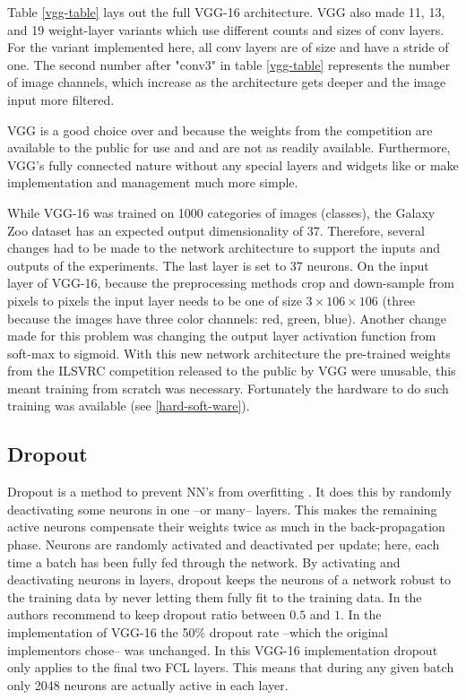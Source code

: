 Table \ref{vgg-table} lays out the full VGG-16 architecture. VGG also made 11, 13, and 19 weight-layer variants which use different counts and sizes of conv layers. For the variant implemented here, all conv layers are of size  and have a stride of one. The second number after "conv3" in table \ref{vgg-table} represents the number of image channels, which increase as the architecture gets deeper and the image input more filtered.

VGG is a good choice over \gnet and \anet because the weights from the competition are available to the public for use and \anet and \gnet are not as readily available. Furthermore, VGG's fully connected nature without any special layers and widgets like \anet or \gnet make implementation and management much more simple. %

While VGG-16 was trained on 1000 categories of images (classes), the Galaxy Zoo dataset has an expected output dimensionality of 37. Therefore, several changes had to be made to the network architecture to support the inputs and outputs of the experiments. The last layer is set to 37 neurons. On the input layer of VGG-16, because the preprocessing methods crop and down-sample from  pixels to  pixels the input layer needs to be one of size $3 \times 106 \times 106$ (three because the images have three color channels: red, green, blue). Another change made for this problem was changing the output layer activation function from soft-max to sigmoid. With this new network architecture the pre-trained weights from the ILSVRC competition released to the public by VGG were unusable, this meant training from scratch was necessary. Fortunately the hardware to do such training was available (see \ref{hard-soft-ware}).

\subsection{Dropout}
Dropout is a method to prevent NN's from overfitting \cite{dropout}. It does this by randomly deactivating some neurons in one --or many-- layers. This makes the remaining active neurons compensate their weights twice as much in the back-propagation phase. Neurons are randomly activated and deactivated per update; here, each time a batch has been fully fed through the network. By activating and deactivating neurons in layers, dropout keeps the neurons of a network robust to the training data by never letting them fully fit to the training data. In \cite{dropout} the authors recommend to keep dropout ratio between $0.5$ and $1$. In the implementation of VGG-16 the 50\% dropout rate --which the original implementors chose-- was unchanged. In this VGG-16 implementation dropout only applies to the final two FCL layers. This means that during any given batch only 2048 neurons are actually active in each layer.

